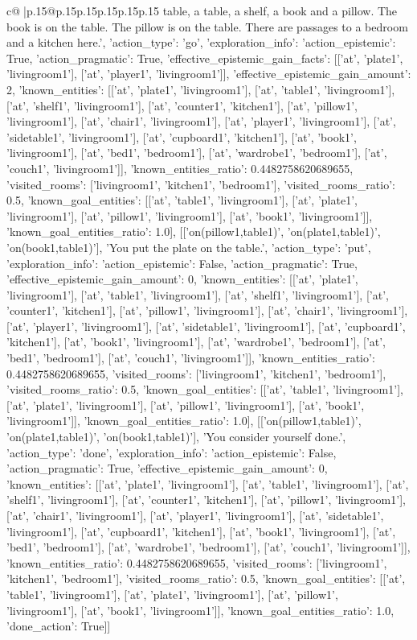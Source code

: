 \documentclass{article}
\begin{document}
{\begin{supertabular}{c@{$\;$}|p{.15\linewidth}@{}p{.15\linewidth}p{.15\linewidth}p{.15\linewidth}p{.15\linewidth}p{.15\linewidth}}
{{{table, a table, a shelf, a book and a pillow. The book is on the table. The pillow is on the table. There are passages to a bedroom and a kitchen here.\n', {'action_type': 'go', 'exploration_info': {'action_epistemic': True, 'action_pragmatic': True, 'effective_epistemic_gain_facts': [['at', 'plate1', 'livingroom1'], ['at', 'player1', 'livingroom1']], 'effective_epistemic_gain_amount': 2, 'known_entities': [['at', 'plate1', 'livingroom1'], ['at', 'table1', 'livingroom1'], ['at', 'shelf1', 'livingroom1'], ['at', 'counter1', 'kitchen1'], ['at', 'pillow1', 'livingroom1'], ['at', 'chair1', 'livingroom1'], ['at', 'player1', 'livingroom1'], ['at', 'sidetable1', 'livingroom1'], ['at', 'cupboard1', 'kitchen1'], ['at', 'book1', 'livingroom1'], ['at', 'bed1', 'bedroom1'], ['at', 'wardrobe1', 'bedroom1'], ['at', 'couch1', 'livingroom1']], 'known_entities_ratio': 0.4482758620689655, 'visited_rooms': ['livingroom1', 'kitchen1', 'bedroom1'], 'visited_rooms_ratio': 0.5, 'known_goal_entities': [['at', 'table1', 'livingroom1'], ['at', 'plate1', 'livingroom1'], ['at', 'pillow1', 'livingroom1'], ['at', 'book1', 'livingroom1']], 'known_goal_entities_ratio': 1.0}}], [['on(pillow1,table1)', 'on(plate1,table1)', 'on(book1,table1)'], 'You put the plate on the table.\n', {'action_type': 'put', 'exploration_info': {'action_epistemic': False, 'action_pragmatic': True, 'effective_epistemic_gain_amount': 0, 'known_entities': [['at', 'plate1', 'livingroom1'], ['at', 'table1', 'livingroom1'], ['at', 'shelf1', 'livingroom1'], ['at', 'counter1', 'kitchen1'], ['at', 'pillow1', 'livingroom1'], ['at', 'chair1', 'livingroom1'], ['at', 'player1', 'livingroom1'], ['at', 'sidetable1', 'livingroom1'], ['at', 'cupboard1', 'kitchen1'], ['at', 'book1', 'livingroom1'], ['at', 'wardrobe1', 'bedroom1'], ['at', 'bed1', 'bedroom1'], ['at', 'couch1', 'livingroom1']], 'known_entities_ratio': 0.4482758620689655, 'visited_rooms': ['livingroom1', 'kitchen1', 'bedroom1'], 'visited_rooms_ratio': 0.5, 'known_goal_entities': [['at', 'table1', 'livingroom1'], ['at', 'plate1', 'livingroom1'], ['at', 'pillow1', 'livingroom1'], ['at', 'book1', 'livingroom1']], 'known_goal_entities_ratio': 1.0}}], [['on(pillow1,table1)', 'on(plate1,table1)', 'on(book1,table1)'], 'You consider yourself done.\n', {'action_type': 'done', 'exploration_info': {'action_epistemic': False, 'action_pragmatic': True, 'effective_epistemic_gain_amount': 0, 'known_entities': [['at', 'plate1', 'livingroom1'], ['at', 'table1', 'livingroom1'], ['at', 'shelf1', 'livingroom1'], ['at', 'counter1', 'kitchen1'], ['at', 'pillow1', 'livingroom1'], ['at', 'chair1', 'livingroom1'], ['at', 'player1', 'livingroom1'], ['at', 'sidetable1', 'livingroom1'], ['at', 'cupboard1', 'kitchen1'], ['at', 'book1', 'livingroom1'], ['at', 'bed1', 'bedroom1'], ['at', 'wardrobe1', 'bedroom1'], ['at', 'couch1', 'livingroom1']], 'known_entities_ratio': 0.4482758620689655, 'visited_rooms': ['livingroom1', 'kitchen1', 'bedroom1'], 'visited_rooms_ratio': 0.5, 'known_goal_entities': [['at', 'table1', 'livingroom1'], ['at', 'plate1', 'livingroom1'], ['at', 'pillow1', 'livingroom1'], ['at', 'book1', 'livingroom1']], 'known_goal_entities_ratio': 1.0}, 'done_action': True}]]
}}}
\end{supertabular}}
\end{document}
